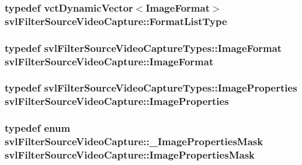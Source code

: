 \hypertarget{classsvl_filter_source_video_capture_af6d31bdf8807755322cd7e5ef1f0d8d9}{
\subsubsection[{Format\-List\-Type}]{\setlength{\rightskip}{0pt plus 5cm}typedef {\bf vct\-Dynamic\-Vector}$<${\bf Image\-Format}$>$ {\bf svl\-Filter\-Source\-Video\-Capture\-::\-Format\-List\-Type}}}\label{classsvl_filter_source_video_capture_af6d31bdf8807755322cd7e5ef1f0d8d9}
\hypertarget{classsvl_filter_source_video_capture_a0944cc8abe4240701683128c28fa5349}{
\subsubsection[{Image\-Format}]{\setlength{\rightskip}{0pt plus 5cm}typedef {\bf svl\-Filter\-Source\-Video\-Capture\-Types\-::\-Image\-Format} {\bf svl\-Filter\-Source\-Video\-Capture\-::\-Image\-Format}}}\label{classsvl_filter_source_video_capture_a0944cc8abe4240701683128c28fa5349}
\hypertarget{classsvl_filter_source_video_capture_ad5d8ccc6a284be386d49b60574937f4d}{
\subsubsection[{Image\-Properties}]{\setlength{\rightskip}{0pt plus 5cm}typedef {\bf svl\-Filter\-Source\-Video\-Capture\-Types\-::\-Image\-Properties} {\bf svl\-Filter\-Source\-Video\-Capture\-::\-Image\-Properties}}}\label{classsvl_filter_source_video_capture_ad5d8ccc6a284be386d49b60574937f4d}
\hypertarget{classsvl_filter_source_video_capture_a52391ed8950c7d9b76ddb7d444a18ed1}{
\subsubsection[{Image\-Properties\-Mask}]{\setlength{\rightskip}{0pt plus 5cm}typedef enum {\bf svl\-Filter\-Source\-Video\-Capture\-::\-\_\-\-Image\-Properties\-Mask}  {\bf svl\-Filter\-Source\-Video\-Capture\-::\-Image\-Properties\-Mask}}}\label{classsvl_filter_source_video_capture_a52391ed8950c7d9b76ddb7d444a18ed1}
